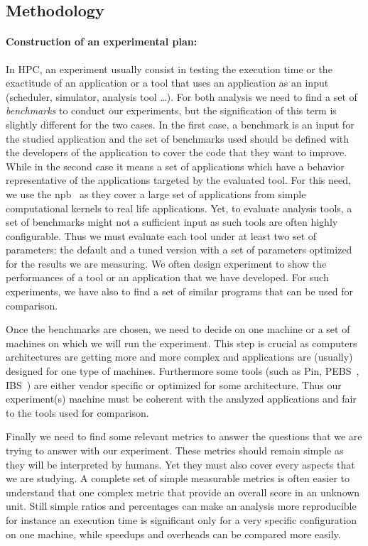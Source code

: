 \subsection{Methodology}

\paragraph{Construction of an experimental plan:}

In \gls{HPC}, an experiment usually consist in testing the execution time or the exactitude of an application or a tool that uses an application as an input (scheduler, simulator, analysis tool \ldots).
For both analysis we need to find a set of \emph{benchmarks} to conduct our experiments, but the signification of this term is slightly different for the two cases.
In the first case, a benchmark is an input for the studied application and the set of benchmarks used should be defined with the developers of the application to cover the code that they want to improve.
While in the second case it means a set of applications which have a behavior representative of the applications targeted by the evaluated tool.
For this need, we use the \gls{npb}~\cite{Jin99NPBOpenMP} as they cover a large set of applications from simple computational kernels to real life applications.
Yet, to evaluate analysis tools, a set of benchmarks might not a sufficient input as such tools are often highly configurable.
Thus we must evaluate each tool under at least two set of parameters: the default and a tuned version with a set of parameters optimized for the results we are measuring.
We often design experiment to show the performances of a tool or an application that we have developed.
For such experiments, we have also to find a set of similar programs that can be used for comparison.

Once the benchmarks are chosen, we need to decide on one machine or a set of machines on which we will run the experiment.
This step is crucial as computers architectures are getting more and more complex  and applications are (usually) designed for one type of machines.
Furthermore some tools (such as \gls{Pin}, \gls{PEBS}~\cite{Levinthal09Performance}, \gls{IBS}~\cite{Drongowski07Instructionbased}) are either vendor specific or optimized for some architecture.
Thus our experiment(s) machine must be coherent with the analyzed applications and fair to the tools used for comparison.

Finally we need to find some relevant metrics to answer the questions that we are trying to answer with our experiment.
These metrics should remain simple as they will be interpreted by humans.
Yet they must also cover every aspects that we are studying.
A complete set of simple measurable metrics is often easier to understand that one complex metric that provide an overall score in an unknown unit.
Still simple ratios and percentages can make an analysis more reproducible for instance an execution time is significant only for a very specific configuration on one machine, while speedups and overheads can be compared more easily.

